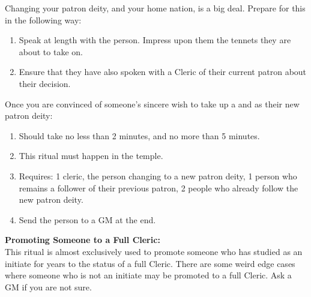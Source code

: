 \documentclass[green]{GL2020}
\begin{document}
Changing your patron deity, and your home nation, is a big deal. Prepare for this in the following way:
  \begin{enumerate}
    \item Speak at length with the person. Impress upon them the tennets they are about to take on.
    \item Ensure that they have also spoken with a Cleric of their current patron about their decision.
  \end{enumerate}

Once you are convinced of someone’s sincere wish to take up a \cEbb{} and \cFlow{} as their new patron deity:
  \begin{enumerate}
    \item Should take no less than 2 minutes, and no more than 5 minutes.
    \item This ritual must happen in the temple.
    \item Requires: 1 cleric, the person changing to a new patron deity, 1 person who remains a follower of their previous patron, 2 people who already follow the new patron deity.
		\item Send the person to a GM at the end.
  \end{enumerate}
   
\textbf{Promoting Someone to a Full Cleric:}\\
This ritual is almost exclusively used to promote someone who has studied as an initiate for years to the status of a full Cleric. There are some weird edge cases where someone who is not an initiate may be promoted to a full Cleric. Ask a GM if you are not sure.
\end{document}
